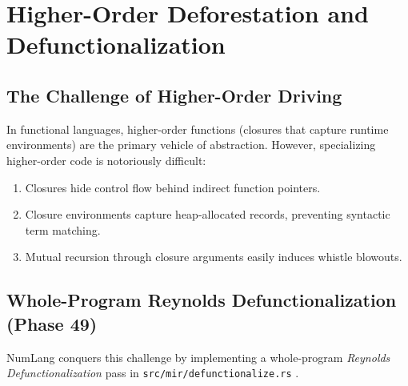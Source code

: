 \chapter{Higher-Order Deforestation and Defunctionalization}
\label{chap:higher_order}

\section{The Challenge of Higher-Order Driving}
\label{sec:higher_order:challenge}

In functional languages, higher-order functions (closures that capture runtime environments) are the primary vehicle of abstraction. However, specializing higher-order code is notoriously difficult:
\begin{enumerate}
    \item Closures hide control flow behind indirect function pointers.
    \item Closure environments capture heap-allocated records, preventing syntactic term matching.
    \item Mutual recursion through closure arguments easily induces whistle blowouts.
\end{enumerate}

\section{Whole-Program Reynolds Defunctionalization (Phase 49)}
\label{sec:higher_order:reynolds}

NumLang conquers this challenge by implementing a whole-program \emph{Reynolds Defunctionalization} pass in \texttt{src/mir/defunctionalize.rs} \citep{reynolds1972definitional}.


